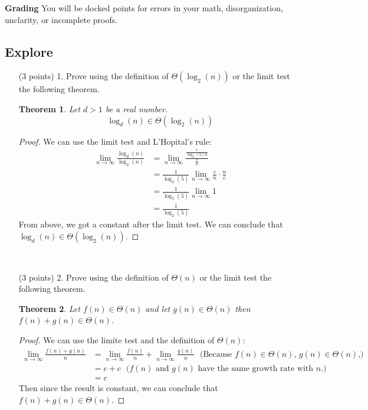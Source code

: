 \documentclass[paper=a4, fontsize=11pt]{scrartcl}
\newtheorem{theorem}{Theorem}
\numberwithin{equation}{section}		%
\numberwithin{figure}{section}			%
\numberwithin{table}{section}				%
\begin{document}
\noindent\textbf{Grading} You will be docked points for errors in your math, disorganization, unclarity, or incomplete proofs. 

\newpage
\subsection{Explore}

\begin{enumerate}
\item [(3 points) 1.] Prove using the definition of $\Theta(\log_2(n))$ or the limit test the following theorem.

\begin{theorem}
Let $d > 1$ be a real number.
\[
\log_d(n) \in \Theta(\log_2(n))
\]
\end{theorem}
\begin{proof}
	We can use the limit test and L'Hopital's rule:
	\begin{align*}
		\lim_{n\rightarrow \infty} \frac{\log_d(n)}{\log_2(n)} &= \lim_{n\rightarrow\infty} \frac{\frac{c}{\log_2(5)n}}{\frac{c}{n}} \\
		&= \frac{1}{\log_2(5)} \lim_{n\rightarrow\infty} \frac{c}{n} \cdot \frac{n}{c} \\
		&= \frac{1}{\log_2(5)} \lim_{n\rightarrow\infty} 1 \\
		&= \frac{1}{\log_2(5)}
	\end{align*}
	From above, we got a constant after the limit test. We can conclude that $\log_d(n) \in \Theta(\log_2(n))$.
\end{proof}

\

\item [(3 points) 2.] Prove using the definition of $\Theta(n)$ or the limit test the following theorem.

\begin{theorem}
Let $f(n)\in\Theta(n)$ and let $g(n)\in\Theta(n)$ then $f(n)+g(n)\in\Theta(n)$.
\end{theorem}
\begin{proof}
	We can use the limite test and the definition of $\Theta(n)$:
	\begin{align*}
		\lim_{n\rightarrow\infty} \frac{f(n)+g(n)}{n} &= \lim_{n\rightarrow\infty}\frac{f(n)}{n}  +  \lim_{n\rightarrow\infty}\frac{g(n)}{n} \ \ \ \text{(Because $f(n)\in\Theta(n)$, $g(n)\in\Theta(n)$,)} \\
		&= c + c  \ \ \  \text{($f(n)$ and $g(n)$ have the same growth rate with $n$.) } \\
		&= c
	\end{align*}
	Then since the result is constant, we can conclude that $f(n)+g(n)\in\Theta(n)$.
\end{proof}


\end{enumerate}
\end{document}
